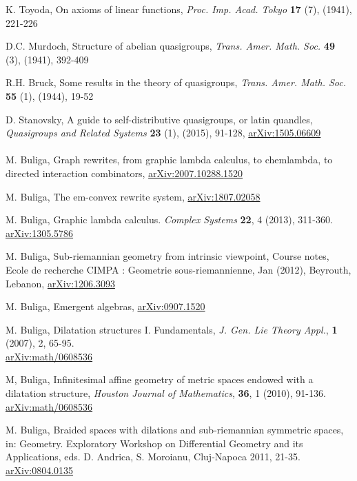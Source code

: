 \documentclass{article}
\begin{document}
\begin{thebibliography}{99}

 K. Toyoda, On axioms of linear functions, {\it Proc. Imp. Acad. Tokyo} {\bf 17} (7), (1941), 221-226

 D.C. Murdoch, Structure of abelian quasigroups, {\it Trans. Amer. Math. Soc.} {\bf 49} (3), (1941), 392-409

 R.H. Bruck, Some results in the theory of quasigroups, {\it Trans. Amer. Math. Soc.} {\bf 55} (1), (1944), 19-52

 D. Stanovsky, A guide to self-distributive quasigroups, or latin quandles, {\it Quasigroups and Related Systems} {\bf 23} (1), (2015), 91-128, \href{https://arxiv.org/abs/1505.06609}{arXiv:1505.06609} \\ 

 \\


 M. Buliga, Graph rewrites, from graphic lambda calculus, to chemlambda, to directed interaction combinators, \href{https://arxiv.org/abs/2007.10288}{arXiv:2007.10288.1520}

 M. Buliga, The em-convex rewrite system, \href{https://arxiv.org/abs/1807.02058}{arXiv:1807.02058}

 M. Buliga, Graphic lambda calculus. {\it Complex Systems} {\bf 22}, 4 (2013), 311-360. \\ 
\href{https://arxiv.org/abs/1305.5786}{arXiv:1305.5786}

 M. Buliga, Sub-riemannian geometry from intrinsic viewpoint, Course notes, Ecole de recherche CIMPA : Geometrie sous-riemannienne, Jan (2012), Beyrouth, Lebanon,  \href{https://arxiv.org/abs/1206.3093}{arXiv:1206.3093}

 M. Buliga, Emergent algebras, \href{https://arxiv.org/abs/0907.1520}{arXiv:0907.1520}

 M. Buliga, Dilatation structures I. Fundamentals, {\it 
J. Gen. Lie Theory Appl.},  {\bf 1} (2007),  2, 65-95. \\ 
\href{https://arxiv.org/abs/math/0608536}{arXiv:math/0608536}


 M, Buliga, Infinitesimal affine geometry of metric spaces endowed with a dilatation structure, {\it Houston Journal of Mathematics}, {\bf 36}, 1 (2010), 91-136. \\ 
\href{https://arxiv.org/abs/0804.0135}{arXiv:math/0608536}


 M. Buliga, Braided spaces with dilations and sub-riemannian symmetric spaces, in: Geometry. Exploratory Workshop on Differential Geometry and its Applications, eds. D. Andrica, S. Moroianu, Cluj-Napoca 2011, 21-35. \\   
\href{https://arxiv.org/abs/1005.5031}{arXiv:0804.0135}



\end{thebibliography}
\end{document}
